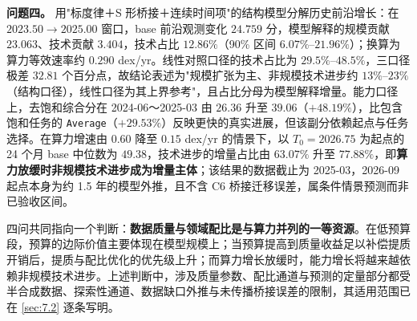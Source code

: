 \textbf{问题四。} 用"标度律＋S 形桥接＋连续时间项"的结构模型分解历史前沿增长：在 $2023.50\to2025.00$ 窗口，base 前沿观测变化 $24.759$ 分，模型解释的规模贡献 $23.063$、技术贡献 $3.404$，技术占比 $12.86\%$（90\% 区间 $6.07\%$–$21.96\%$）；换算为算力等效速率约 $0.290$ dex/yr。线性对照口径的技术占比为 $29.5\%$–$48.5\%$，三口径极差 $32.81$ 个百分点，故结论表述为"规模扩张为主、非规模技术进步约 $13\%$–$23\%$（结构口径），线性口径为其上界参考"，且占比分母为模型解释增量。能力口径上，去饱和综合分在 2024-06～2025-03 由 $26.36$ 升至 $39.06$（$+48.19\%$），比包含饱和任务的 \texttt{Average}（$+29.53\%$）反映更快的真实进展，但该副分依赖起点与任务选择。在算力增速由 $0.60$ 降至 $0.15$ dex/yr 的情景下，以 $T_0=2026.75$ 为起点的 24 个月 base 中位数为 $49.38$，技术进步的增量占比由 $63.07\%$ 升至 $77.88\%$，即\textbf{算力放缓时非规模技术进步成为增量主体}；该结果的数据截止为 2025-03，2026-09 起点本身为约 1.5 年的模型外推，且不含 C6 桥接迁移误差，属条件情景预测而非已验收区间。

四问共同指向一个判断：\textbf{数据质量与领域配比是与算力并列的一等资源}。在低预算段，预算的边际价值主要体现在模型规模上；当预算提高到质量收益足以补偿提质开销后，提质与配比优化的优先级上升；而算力增长放缓时，能力增长将越来越依赖非规模技术进步。上述判断中，涉及质量参数、配比通道与预测的定量部分都受半合成数据、探索性通道、数据缺口外推与未传播桥接误差的限制，其适用范围已在 \ref{sec:7.2} 逐条写明。

